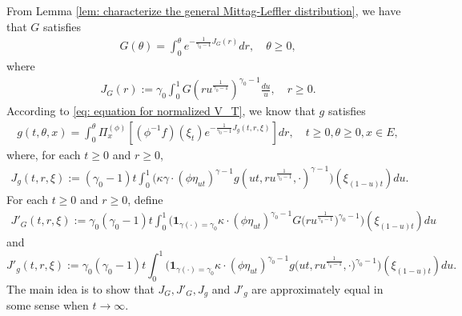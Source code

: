 \documentclass[12pt,a4paper]{amsart}
\theoremstyle{definition}
\numberwithin{equation}{section}
\begin{document}
From Lemma \ref{lem: characterize the general Mittag-Leffler distribution}, we have that $G$ satisfies
\begin{align}\label{eq: equation for G}
	G(\theta)
	= \int_0^\theta e^{ - \frac{1} {\gamma_0 - 1} J_G(r)} dr,
	\quad \theta \geq 0,
\end{align}
where
\begin{align}\label{eq: definition for J_G}
	J_G(r):=
	\gamma_0 \int_0^1 G(ru^{\frac{1}{\gamma_0 - 1}}) ^{\gamma_0 - 1}\frac{du}{u},
	\quad r\geq 0 .
\end{align}
According to \eqref{eq: equation for normalized V_T}, we know that $g$ satisfies
\begin{align}\label{eq: equation for g}
	g(t,\theta, x)= \int_0^{\theta} \Pi_x^{(\phi)} [ (\phi^{-1}f)(\xi_t) e^{-\frac{1}{\gamma_0 - 1} J_g(t,r,\xi) } ] dr,
	\quad t\geq 0, \theta \geq 0, x\in E,
\end{align}
where, for each $t\geq 0$ and $r\geq 0$,
\begin{align}\label{eq: definition for J_g}
	J_g(t,r,\xi):=
	(\gamma_0 - 1)t\int_0^1 \big(  \kappa \gamma \cdot (   \phi \eta_{ut}  )^{\gamma - 1} g (ut,ru^{\frac{1}{\gamma_0 - 1}},\cdot )^{\gamma-1}  \big) (  \xi_{(1-u)t}  ) du.
\end{align}
For each $t\geq 0$ and $r\geq 0$, define
\begin{align}\label{eq: definition of J'_G}
	J'_G(t,r,\xi):=
	\gamma_0 (\gamma_0 - 1) t \int_0^1 \big( \mathbf 1_{\gamma(\cdot) = \gamma_0} \kappa \cdot (\phi \eta_{ut})^{\gamma_0 - 1} G\big( ru^{\frac{1}{\gamma_0 - 1}} \big) ^{\gamma_0 - 1} \big) (\xi_{(1-u)t}) du
\end{align}
and
\begin{equation}\label{eq: definition of J'_g}
	J'_g(t,r,\xi):=
	\gamma_0 (\gamma_0 - 1) t \int_0^1 \big( \mathbf 1_{\gamma(\cdot) = \gamma_0} \kappa \cdot (\phi \eta_{ut})^{\gamma_0 - 1} g\big( ut,ru^{\frac{1}{\gamma_0 - 1}}, \cdot \big)^{\gamma_0 - 1}  \big) (\xi_{(1-u)t})  du.
\end{equation}
The main idea is
to show that $J_G,J'_G,J_g$ and $J'_g$ are approximately equal in some sense when $t\to \infty$.
	
\end{document}
